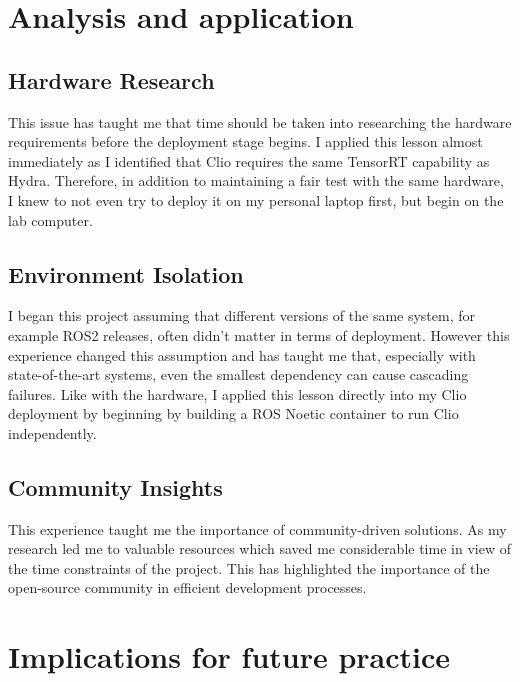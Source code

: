 
\section{Analysis and application}\label{sec:reflection}

\subsection{Hardware Research}\label{sec:ref:hardware-research-analysis}

This issue has taught me that time should be taken into researching the hardware requirements before the deployment stage begins. I applied this lesson almost immediately as I identified that Clio requires the same TensorRT capability as Hydra. Therefore, in addition to maintaining a fair test with the same hardware, I knew to not even try to deploy it on my personal laptop first, but begin on the lab computer.

\subsection{Environment Isolation}\label{sec:ref:environment-isolation-analysis}

I began this project assuming that different versions of the same system, for example ROS2 releases, often didn’t matter in terms of deployment. However this experience changed this assumption and has taught me that, especially with state-of-the-art systems, even the smallest dependency can cause cascading failures. Like with the hardware, I applied this lesson directly into my Clio deployment by beginning by building a ROS Noetic container to run Clio independently.

\subsection{Community Insights}\label{sec:ref:community-insights-analysis}

This experience taught me the importance of community-driven solutions. As my research led me to valuable resources which saved me considerable time in view of the time constraints of the project. This has highlighted the importance of the open-source community in efficient development processes.


\section{Implications for future practice}\label{sec:implications}

